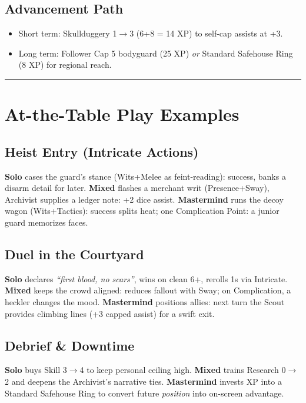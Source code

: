 \documentclass[12pt]{book}
\begin{document}
\subsection*{Advancement Path}
\begin{itemize}
  \item Short term: Skullduggery 1$\rightarrow$3 (6+8 = 14 XP) to self-cap assists at +3.
  \item Long term: Follower Cap 5 bodyguard (25 XP) \emph{or} Standard Safehouse Ring (8 XP) for regional reach.
\end{itemize}

\bigskip
\hrule
\bigskip

\section{At-the-Table Play Examples}

\subsection*{Heist Entry (Intricate Actions)}
\textbf{Solo} cases the guard’s stance (Wits+Melee as feint-reading): success, banks a disarm detail for later.  
\textbf{Mixed} flashes a merchant writ (Presence+Sway), Archivist supplies a ledger note: +2 dice assist.  
\textbf{Mastermind} runs the decoy wagon (Wits+Tactics): success splits heat; one Complication Point: a junior guard memorizes faces.

\subsection*{Duel in the Courtyard}
\textbf{Solo} declares \emph{``first blood, no scars''}, wins on clean 6+, rerolls 1s via Intricate.  
\textbf{Mixed} keeps the crowd aligned: reduces fallout with Sway; on Complication, a heckler changes the mood.  
\textbf{Mastermind} positions allies: next turn the Scout provides climbing lines (+3 capped assist) for a swift exit.

\subsection*{Debrief \& Downtime}
\textbf{Solo} buys Skill 3$\rightarrow$4 to keep personal ceiling high.  
\textbf{Mixed} trains Research 0$\rightarrow$2 and deepens the Archivist’s narrative ties.  
\textbf{Mastermind} invests XP into a Standard Safehouse Ring to convert future \emph{position} into on-screen advantage.
\end{document}
